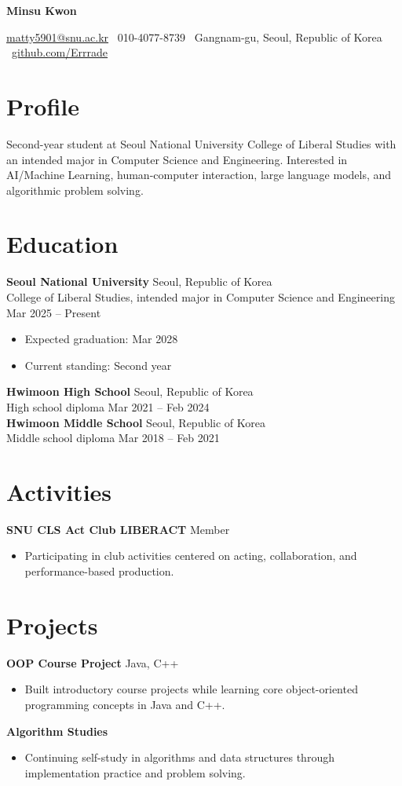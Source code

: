\documentclass[11pt]{article}
\newcommand{\cvheader}[1]{
  {\fontsize{22}{24}\selectfont\bfseries #1}\par
}
\newcommand{\educationentry}[4]{
  \textbf{#1} \hfill #2 \\
  #3 \hfill #4 \\
}
\begin{document}
\cvheader{Minsu Kwon}
\href{mailto:matty5901@snu.ac.kr}{matty5901@snu.ac.kr} \textbar\ 010-4077-8739 \textbar\ Gangnam-gu, Seoul, Republic of Korea \textbar\ \href{https://github.com/Errrade}{github.com/Errrade}

\section*{Profile}
Second-year student at Seoul National University College of Liberal Studies with an intended major in Computer Science and Engineering. Interested in AI/Machine Learning, human-computer interaction, large language models, and algorithmic problem solving.

\section*{Education}
\educationentry{Seoul National University}{Seoul, Republic of Korea}{College of Liberal Studies, intended major in Computer Science and Engineering}{Mar 2025 -- Present}
\begin{itemize}
  \item Expected graduation: Mar 2028
  \item Current standing: Second year
\end{itemize}

\educationentry{Hwimoon High School}{Seoul, Republic of Korea}{High school diploma}{Mar 2021 -- Feb 2024}

\educationentry{Hwimoon Middle School}{Seoul, Republic of Korea}{Middle school diploma}{Mar 2018 -- Feb 2021}

\section*{Activities}
\textbf{SNU CLS Act Club LIBERACT} \hfill Member
\begin{itemize}
  \item Participating in club activities centered on acting, collaboration, and performance-based production.
\end{itemize}

\section*{Projects}
\textbf{OOP Course Project} \hfill Java, C++
\begin{itemize}
  \item Built introductory course projects while learning core object-oriented programming concepts in Java and C++.
\end{itemize}

\textbf{Algorithm Studies}
\begin{itemize}
  \item Continuing self-study in algorithms and data structures through implementation practice and problem solving.
\end{itemize}
\end{document}
